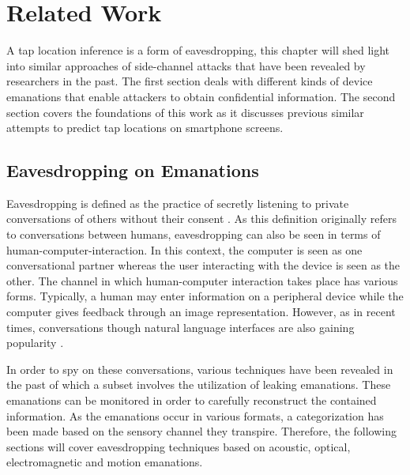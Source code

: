 \chapter{Related Work\label{cha:chapter2}}
A tap location inference is a form of eavesdropping, this chapter will shed light into similar approaches of side-channel attacks that have been revealed by researchers in the past. The first section deals with different kinds of device emanations that enable attackers to obtain confidential information. The second section covers the foundations of this work as it discusses previous similar attempts to predict tap locations on smartphone screens.

\section{Eavesdropping on Emanations}

Eavesdropping is defined as the practice of secretly listening to private conversations of others without their consent \cite{black1990black}. As this definition originally refers to conversations between humans, eavesdropping can also be seen in terms of human-computer-interaction. In this context, the computer is seen as one conversational partner whereas the user interacting with the device is seen as the other. The channel in which human-computer interaction takes place has various forms. Typically, a human may enter information on a peripheral device while the computer gives feedback through an image representation. However, as in recent times, conversations though natural language interfaces are also gaining popularity \cite{shneiderman2016designing}.

In order to spy on these conversations, various techniques have been revealed in the past of which a subset involves the utilization of leaking emanations. These emanations can be monitored in order to carefully reconstruct the contained information. As the emanations occur in various formats, a categorization has been made based on the sensory channel they transpire. Therefore, the following sections will cover eavesdropping techniques based on acoustic, optical, electromagnetic and motion emanations.


